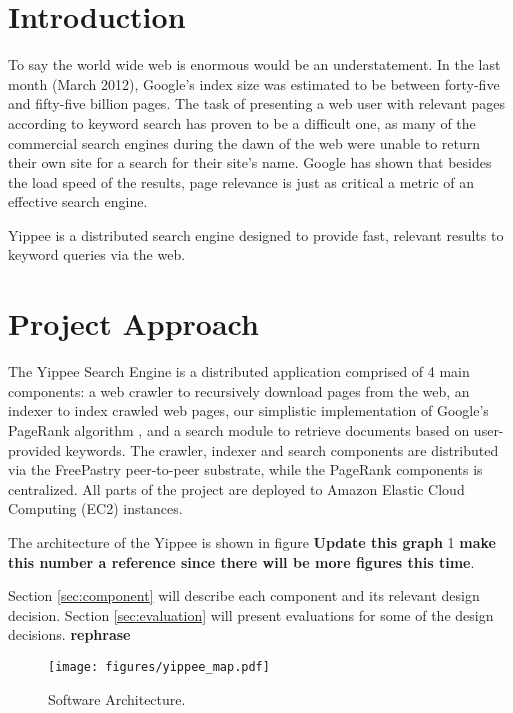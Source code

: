 \documentclass[11pt, letterpaper, oneside, twocolumn]{article}
\begin{document}
\section{ Introduction }

To say the world wide web is enormous would be an understatement.  
In the last month (March 2012),  Google's index size was estimated to be between forty-five and fifty-five billion pages.\cite{websize}
The task of presenting a web user with relevant pages according to keyword search has proven to be a difficult one, as many of the commercial search engines during the dawn of the web were unable to return their own site for a search for their site's name.\cite{google} 
Google has shown that besides the load speed of the results, page relevance is just as critical a metric of an effective search engine. 

Yippee is a distributed search engine designed to provide fast, relevant results to keyword queries via the web.  

\section{Project Approach}
\label{sec:approach}

The Yippee Search Engine is a distributed application comprised of 4 main components: a web crawler to recursively download pages from the web, an indexer to index crawled web pages, our simplistic implementation of Google's PageRank algorithm \cite{pagerank}, and a search module to retrieve documents based on user-provided keywords.  
The crawler, indexer and search components are distributed via the FreePastry peer-to-peer substrate, while the PageRank components is centralized.  All parts of the project are deployed to Amazon Elastic Cloud Computing (EC2) instances.  

The architecture of the Yippee is shown in figure \textbf{Update this graph} 1 \textbf{make this number a reference since there will be more figures this time}.


Section \ref{sec:component} will describe each component and its relevant design decision.
Section \ref{sec:evaluation} will present evaluations for some of the design decisions. \textbf{rephrase}


\label{sec:SOAR} %
\begin{figure}[!b]
  \centering
  \texttt{[image: figures/yippee\_map.pdf]}
  \caption{Software Architecture.}
\end{figure}
\end{document}
